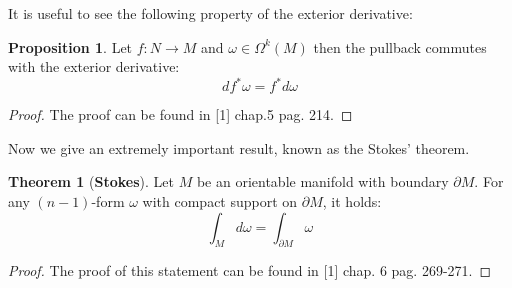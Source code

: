 \documentclass[12pt,a4paper]{report}
\theoremstyle{definition}
\theoremstyle{Theorem}
\newtheorem{Theo}[Def]{Theorem}
\newtheorem{Prop}[Def]{Proposition}
\theoremstyle{definition}
\theoremstyle{definition}
\begin{document}
	It is useful to see the following property of the exterior derivative:
	\begin{Prop}
		Let $f:N\rightarrow M$ and $\omega\in \Omega^k(M)$ then the pullback commutes with the exterior derivative:
		$$df^*\omega=f^*d\omega$$
	\end{Prop}
	\begin{proof}
		The proof can be found in [1] chap.5 pag. 214.
	\end{proof}
	Now we give an extremely important result, known as the Stokes' theorem.
	\begin{Theo}[\textbf{Stokes}]\label{Stokes}
		Let $M$ be an orientable manifold with boundary $\partial M$. For any $(n-1)$-form $\omega$ with compact support on $\partial M$, it holds:
		$$\int_M d\omega=\int_{\partial M}\omega$$ 
	\end{Theo}
	\begin{proof}
		The proof of this statement can be found in [1] chap. 6 pag. 269-271.
	\end{proof}
\end{document}
